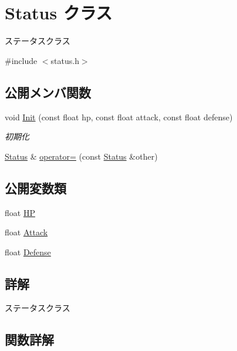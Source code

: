 \hypertarget{class_status}{}\section{Status クラス}
\label{class_status}


ステータスクラス  




{\ttfamily \#include $<$status.\+h$>$}

\subsection*{公開メンバ関数}
\begin{DoxyCompactItemize}
\item 
void \mbox{\hyperlink{class_status_a04cf2752224db252d7694c2caf5caf83}{Init}} (const float hp, const float attack, const float defense)
\begin{DoxyCompactList}\small\item\em 初期化 \end{DoxyCompactList}\item 
\mbox{\hyperlink{class_status}{Status}} \& \mbox{\hyperlink{class_status_abc76064ed2504493c3bbc0f287a49525}{operator=}} (const \mbox{\hyperlink{class_status}{Status}} \&other)
\end{DoxyCompactItemize}
\subsection*{公開変数類}
\begin{DoxyCompactItemize}
\item 
float \mbox{\hyperlink{class_status_a0ec54fdb31c6c4b1a23b22742e6babb4}{HP}}
\item 
float \mbox{\hyperlink{class_status_aede601b020ef15845b86d631a46f8980}{Attack}}
\item 
float \mbox{\hyperlink{class_status_aee944c63904ca1b6b3b04e24b2a9ac12}{Defense}}
\end{DoxyCompactItemize}


\subsection{詳解}
ステータスクラス 

\subsection{関数詳解}
\mbox{\label{class_status_a04cf2752224db252d7694c2caf5caf83}} 
